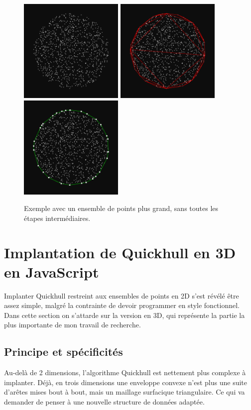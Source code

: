 \documentclass[]{article}
\begin{document}
\begin{figure}[H]
	\includegraphics[width=5cm]{qh2d/demo2d/frame_b0.png}
	\includegraphics[width=5cm]{qh2d/demo2d/frame_b1.png}
	\includegraphics[width=5cm]{qh2d/demo2d/frame_b2.png}
	\caption{Exemple avec un ensemble de points plus grand, sans toutes les étapes intermédiaires.}
\end{figure}

\section{Implantation de Quickhull en 3D en JavaScript}
Implanter Quickhull restreint aux ensembles de points en 2D s'est révélé être assez simple, malgré la contrainte de devoir programmer en style fonctionnel. Dans cette section on s'attarde sur la version en 3D, qui représente la partie la plus importante de mon travail de recherche.

\subsection{Principe et spécificités}
Au-delà de 2 dimensions, l'algorithme Quickhull est nettement plus complexe à implanter. Déjà, en trois dimensions une enveloppe convexe n'est plus une suite d'arêtes mises bout à bout, mais un maillage surfacique triangulaire. Ce qui va demander de penser à une nouvelle structure de données adaptée.
\end{document}
